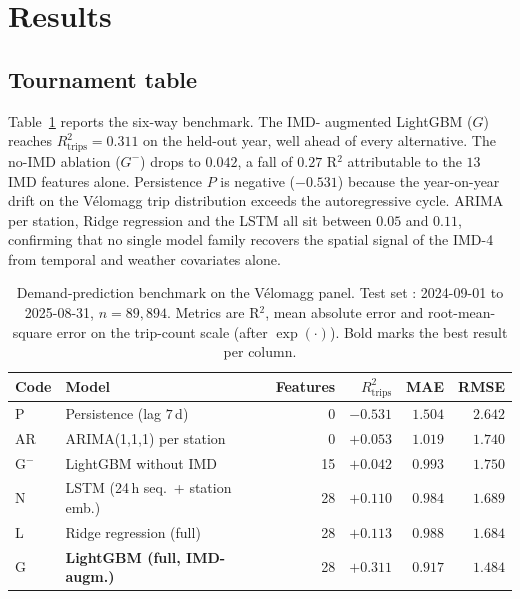 \documentclass[11pt,a4paper]{article}
\begin{document}
\section{Results}
\label{sec:results}

\subsection{Tournament table}

Table~\ref{tab:bench} reports the six-way benchmark.  The IMD-
augmented LightGBM ($G$) reaches $R^{2}_{\text{trips}} = 0.311$
on the held-out year, well ahead of every alternative.  The
no-IMD ablation ($G^{-}$) drops to $0.042$, a fall of $0.27$
R$^{2}$ attributable to the $13$ IMD features alone.  Persistence
$P$ is negative ($-0.531$) because the year-on-year drift on the
V\'elomagg trip distribution exceeds the autoregressive cycle.
ARIMA per station, Ridge regression and the LSTM all sit between
$0.05$ and $0.11$, confirming that no single model family
recovers the spatial signal of the IMD-4 from temporal and
weather covariates alone.

\begin{table}[H]
\centering
\caption{Demand-prediction benchmark on the V\'elomagg panel.
Test set : 2024-09-01 to 2025-08-31, $n = 89{,}894$.
Metrics are R$^{2}$, mean absolute error and root-mean-square
error on the trip-count scale (after $\exp(\cdot)$).  Bold marks
the best result per column.}
\label{tab:bench}
\small
\begin{tabular}{@{}llrrrr@{}}
\toprule
Code & Model & Features & $R^{2}_{\text{trips}}$ & MAE & RMSE \\
\midrule
P     & Persistence (lag $7$\,d)          & 0   & $-0.531$ & $1.504$ & $2.642$ \\
AR    & ARIMA(1,1,1) per station          & 0   & $+0.053$ & $1.019$ & $1.740$ \\
G$^-$ & LightGBM without IMD              & 15  & $+0.042$ & $0.993$ & $1.750$ \\
N     & LSTM (24\,h seq.\ + station emb.) & 28  & $+0.110$ & $0.984$ & $1.689$ \\
L     & Ridge regression (full)           & 28  & $+0.113$ & $0.988$ & $1.684$ \\
G     & \textbf{LightGBM (full, IMD-augm.)} & 28 & $\mathbf{+0.311}$ & $\mathbf{0.917}$ & $\mathbf{1.484}$ \\
\bottomrule
\end{tabular}
\end{table}
\end{document}
